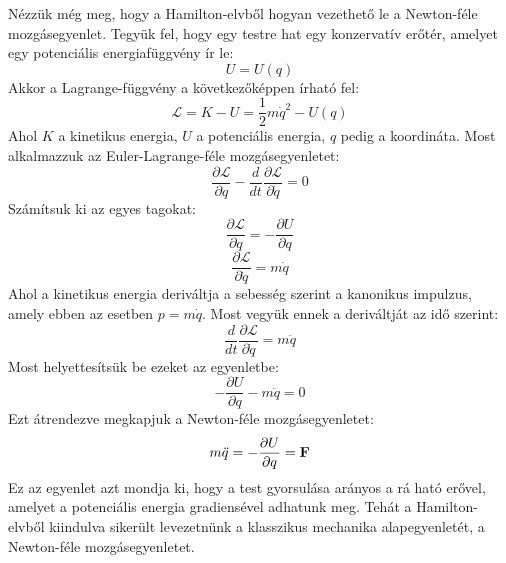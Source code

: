 \documentclass[a4paper,12pt]{article}
\begin{document}
Nézzük még meg, hogy a Hamilton-elvből hogyan vezethető le a Newton-féle mozgásegyenlet. Tegyük fel, hogy egy testre hat egy konzervatív erőtér, amelyet egy potenciális energiafüggvény ír le:
\begin{equation}
    U = U(q)
\end{equation}
Akkor a Lagrange-függvény a következőképpen írható fel:
\begin{equation}
    \mathcal{L} = K - U = \frac{1}{2}m \dot{q}^2 - U(q)
\end{equation}
Ahol $K$ a kinetikus energia, $U$ a potenciális energia, $q$ pedig a koordináta. Most alkalmazzuk az Euler-Lagrange-féle mozgásegyenletet:
\begin{equation}
    \frac{\partial \mathcal{L}}{\partial q} - \frac{d}{dt} \frac{\partial \mathcal{L}}{\partial \dot{q}} = 0
\end{equation}
Számítsuk ki az egyes tagokat:
\begin{equation}
    \frac{\partial \mathcal{L}}{\partial q} = - \frac{\partial U}{\partial q}
\end{equation}
\begin{equation}
    \frac{\partial \mathcal{L}}{\partial \dot{q}} = m \dot{q}
\end{equation}
Ahol a kinetikus energia deriváltja a sebesség szerint a kanonikus impulzus, amely ebben az esetben $p = m \dot{q}$. Most vegyük ennek a deriváltját az idő szerint:
\begin{equation}
    \frac{d}{dt} \frac{\partial \mathcal{L}}{\partial \dot{q}} = m \ddot{q}
\end{equation}
Most helyettesítsük be ezeket az egyenletbe:
\begin{equation}
    - \frac{\partial U}{\partial q} - m \ddot{q} = 0
\end{equation}
Ezt átrendezve megkapjuk a Newton-féle mozgásegyenletet:
\begin{equation}
    m \ddot{q} = - \frac{\partial U}{\partial q} = \bold{F}
\end{equation}
Ez az egyenlet azt mondja ki, hogy a test gyorsulása arányos a rá ható erővel, amelyet a potenciális energia gradiensével adhatunk meg. Tehát a Hamilton-elvből kiindulva sikerült levezetnünk a klasszikus mechanika alapegyenletét, a Newton-féle mozgásegyenletet.
\end{document}
